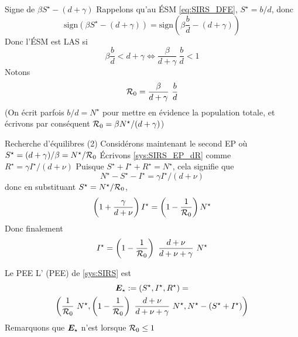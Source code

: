 \documentclass[aspectratio=169]{beamer}\usepackage[]{graphicx}\usepackage[]{xcolor}
\begin{document}
\begin{frame}{Signe de $\beta S^\star-(d+\gamma)$}
Rappelons qu'au ÉSM \eqref{eq:SIRS_DFE}, $S^\star=b/d$, donc
\[
\text{sign}(\beta S^\star-(d+\gamma))
=\text{sign}\left(
\beta\frac{b}{d} -(d+\gamma)
\right)
\]
Donc l'ÉSM est LAS si
\[
\beta\frac bd < d+\gamma
\iff \frac\beta{d+\gamma}\ \frac bd <1
\]
Notons
\begin{equation}\label{eq:SIRS_R0}
\mathcal{R}_0 = \frac\beta{d+\gamma}\ \frac bd
\end{equation}
\vfill
(On écrit parfois $b/d=N^\star$ pour mettre en évidence la population totale, et écrivons par conséquent $\mathcal{R}_0=\beta N^\star/(d+\gamma)$)
\end{frame}


\begin{frame}{Recherche d'équilibres (2)}
Considérons maintenant le second EP où $S^\star=(d+\gamma)/\beta=N^\star/\mathcal{R}_0$
\vfill
Écrivons \eqref{sys:SIRS_EP_dR} comme $R^\star=\gamma I^\star/(d+\nu)$
\vfill
Puisque $S^\star+I^\star+R^\star=N^\star$, cela signifie que
\[
N^\star-S^\star-I^\star = \gamma I^\star/(d+\nu)
\]
donc en substituant $S^\star = N^\star/\mathcal{R}_0$,
\[
\left(1+\frac{\gamma}{d+\nu}\right)I^\star = \left(1-\frac{1}{\mathcal{R}_0}\right)N^\star
\]
Donc finalement
\[
I^\star = \left(1-\frac{1}{\mathcal{R}_0}\right)\
\frac{d+\nu}{d+\nu+\gamma}\ N^\star
\]
\end{frame}


\begin{frame}{Le PEE}
L' (PEE) de \eqref{sys:SIRS} est
\begin{multline}\label{eq:SIRS_EEP}
\bm{E}_\star:=(S^\star,I^\star,R^\star) = \\
\left(
\frac{1}{\mathcal{R}_0}\ N^\star,
\left(1-\frac{1}{\mathcal{R}_0}\right)\
\frac{d+\nu}{d+\nu+\gamma}\ N^\star,
N^\star-(S^\star+I^\star)
\right)
\end{multline}
\vfill
Remarquons que $\bm{E}_\star$ n'est  lorsque $\mathcal{R}_0\leq 1$
\end{frame}
\end{document}

